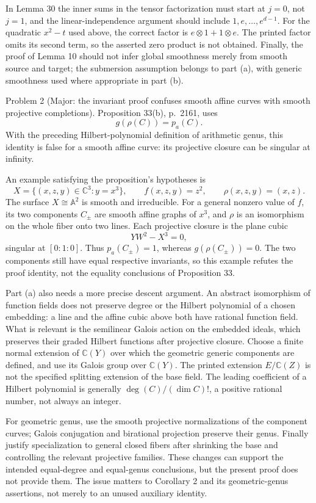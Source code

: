 \documentclass[10pt]{article}
\begin{document}
In Lemma 30 the inner sums in the tensor factorization must start at \(j=0\), not \(j=1\), and the linear-independence argument should include \(1,e,\ldots,e^{d-1}\). For the quadratic \(x^2-t\) used above, the correct factor is \(e\otimes1+1\otimes e\). The printed factor omits its second term, so the asserted zero product is not obtained. Finally, the proof of Lemma 10 should not infer global smoothness merely from smooth source and target; the submersion assumption belongs to part (a), with generic smoothness used where appropriate in part (b).\par
Problem 2 (Major: the invariant proof confuses smooth affine curves with smooth projective completions).  Proposition 33(b), p. 2161, uses \[g(\rho(C))=p_a(C).\] With the preceding Hilbert-polynomial definition of arithmetic genus, this identity is false for a smooth affine curve: its projective closure can be singular at infinity.\par
An example satisfying the proposition’s hypotheses is \[X=\{(x,z,y)\in\mathbb C^3:y=x^3\},\qquad f(x,z,y)=z^2,\qquad
 \rho(x,z,y)=(x,z).\] The surface \(X\cong\mathbb A^2\) is smooth and irreducible. For a general nonzero value of \(f\), its two components \(C_\pm\) are smooth affine graphs of \(x^3\), and \(\rho\) is an isomorphism on the whole fiber onto two lines. Each projective closure is the plane cubic \[YW^2-X^3=0,\] singular at \([0:1:0]\). Thus \(p_a(C_\pm)=1\), whereas \(g(\rho(C_\pm))=0\). The two components still have equal respective invariants, so this example refutes the proof identity, not the equality conclusions of Proposition 33.\par
Part (a) also needs a more precise descent argument. An abstract isomorphism of function fields does not preserve degree or the Hilbert polynomial of a chosen embedding: a line and the affine cubic above both have rational function field. What is relevant is the semilinear Galois action on the embedded ideals, which preserves their graded Hilbert functions after projective closure. Choose a finite normal extension of \(\mathbb C(Y)\) over which the geometric generic components are defined, and use its Galois group over \(\mathbb C(Y)\). The printed extension \(E/\mathbb C(Z)\) is not the specified splitting extension of the base field. The leading coefficient of a Hilbert polynomial is generally \(\deg(C)/(\dim C)!\), a positive rational number, not always an integer.\par
For geometric genus, use the smooth projective normalizations of the component curves; Galois conjugation and birational projection preserve their genus. Finally justify specialization to general closed fibers after shrinking the base and controlling the relevant projective families. These changes can support the intended equal-degree and equal-genus conclusions, but the present proof does not provide them. The issue matters to Corollary 2 and its geometric-genus assertions, not merely to an unused auxiliary identity.\par
\end{document}
